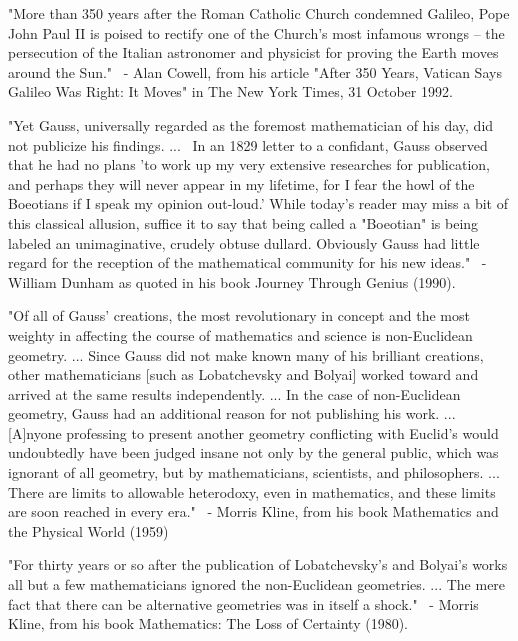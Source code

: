 \documentclass[12pt]{article}
\begin{document}
"More than 350 years after the Roman Catholic Church condemned Galileo, Pope John Paul II is poised to rectify one of the Church's most infamous wrongs -- the persecution of the Italian astronomer and physicist for proving the Earth moves around the Sun."
 - Alan Cowell, from his article "After 350 Years, Vatican Says Galileo Was Right: It Moves" in The New York Times, 31 October 1992.

"Yet Gauss, universally regarded as the foremost mathematician of his day, did not publicize his findings. ...  In an 1829 letter to a confidant, Gauss observed that he had no plans 'to work up my very extensive researches for publication, and perhaps they will never appear in my lifetime, for I fear the howl of the Boeotians if I speak my opinion out-loud.' While today's reader may miss a bit of this classical allusion, suffice it to say that being called a "Boeotian" is being labeled an unimaginative, crudely obtuse dullard. Obviously Gauss had little regard for the reception of the mathematical community for his new ideas."
 - William Dunham as quoted in his book Journey Through Genius (1990).

"Of all of Gauss' creations, the most revolutionary in concept and the most weighty in affecting the course of mathematics and science is non-Euclidean geometry. ... Since Gauss did not make known many of his brilliant creations, other mathematicians [such as Lobatchevsky and Bolyai] worked toward and arrived at the same results independently. ... In the case of non-Euclidean geometry, Gauss had an additional reason for not publishing his work. ... [A]nyone professing to present another geometry conflicting with Euclid's would undoubtedly have been judged insane not only by the general public, which was ignorant of all geometry, but by mathematicians, scientists, and philosophers. ... There are limits to allowable heterodoxy, even in mathematics, and these limits are soon reached in every era."
 - Morris Kline, from his book Mathematics and the Physical World (1959)

"For thirty years or so after the publication of Lobatchevsky's and Bolyai's works all but a few mathematicians ignored the non-Euclidean geometries. ... The mere fact that there can be alternative geometries was in itself a shock."
 - Morris Kline, from his book Mathematics: The Loss of Certainty (1980).
\end{document}
